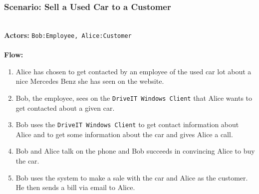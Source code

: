 \subsubsection{Scenario: Sell a Used Car to a Customer}
\HRule \\[0.4cm]
\textbf{Actors:} \texttt{Bob:Employee, Alice:Customer}\\
\HRule \\[0.4cm]
\textbf{Flow:} \\
\begin{enumerate}
\item Alice has chosen to get contacted by an employee of the used car lot about a nice Mercedes Benz she has seen on the website.
\item Bob, the employee, sees on the \texttt{DriveIT Windows Client} that Alice wants to get contacted about a given car.
\item Bob uses the \texttt{DriveIT Windows Client} to get contact information about Alice and to get some information about the car and gives Alice a call.
\item Bob and Alice talk on the phone and Bob succeeds in convincing Alice to buy the car.
\item Bob uses the system to make a sale with the car and Alice as the customer. He then sends a bill via email to Alice.
\end{enumerate}
\HRule \\[0.4cm]
